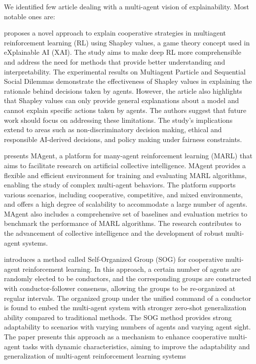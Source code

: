 \documentclass[runningheads]{llncs}
\begin{document}
We identified few article dealing with a multi-agent vision of explainability. Most notable ones are:

\cite{Heuillet2022} proposes a novel approach to explain cooperative strategies in multiagent reinforcement learning (RL) using Shapley values, a game theory concept used in eXplainable AI (XAI). The study aims to make deep RL more comprehensible and address the need for methods that provide better understanding and interpretability. The experimental results on Multiagent Particle and Sequential Social Dilemmas demonstrate the effectiveness of Shapley values in explaining the rationale behind decisions taken by agents. However, the article also highlights that Shapley values can only provide general explanations about a model and cannot explain specific actions taken by agents. The authors suggest that future work should focus on addressing these limitations. The study's implications extend to areas such as non-discriminatory decision making, ethical and responsible AI-derived decisions, and policy making under fairness constraints.

\cite{Zheng2018} presents MAgent, a platform for many-agent reinforcement learning (MARL) that aims to facilitate research on artificial collective intelligence. MAgent provides a flexible and efficient environment for training and evaluating MARL algorithms, enabling the study of complex multi-agent behaviors. The platform supports various scenarios, including cooperative, competitive, and mixed environments, and offers a high degree of scalability to accommodate a large number of agents. MAgent also includes a comprehensive set of baselines and evaluation metrics to benchmark the performance of MARL algorithms. The research contributes to the advancement of collective intelligence and the development of robust multi-agent systems.

\cite{Shao2022} introduces a method called Self-Organized Group (SOG) for cooperative multi-agent reinforcement learning. In this approach, a certain number of agents are randomly elected to be conductors, and the corresponding groups are constructed with conductor-follower consensus, allowing the groups to be re-organized at regular intervals. The organized group under the unified command of a conductor is found to embed the multi-agent system with stronger zero-shot generalization ability compared to traditional methods. The SOG method provides strong adaptability to scenarios with varying numbers of agents and varying agent sight. The paper presents this approach as a mechanism to enhance cooperative multi-agent tasks with dynamic characteristics, aiming to improve the adaptability and generalization of multi-agent reinforcement learning systems
\end{document}
